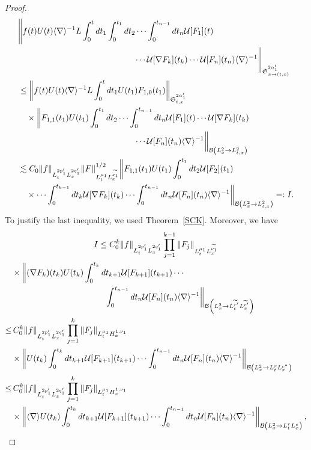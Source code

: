 \documentclass[10pt]{amsart}
\newcommand{\No}[1]{}
\theoremstyle{definition}
\numberwithin{equation}{section}
\newcommand{\CB}{\mathcal{B}}
\newcommand{\CU}{\mathcal{U}}
\newcommand{\FS}{\mathfrak{S}}
\newcommand{\al}{\alpha}
\newcommand{\wt}{\widetilde}
\renewcommand{\No}[1]{\left\| #1 \right\|}
\newcommand{\sd}{\langle \nabla \rangle}
\newcommand{\sdi}{\sd^{-1}}
\newcommand{\tx}{{t,x}}
\newcommand{\na}{\nabla}
\newcommand{\ls}{\lesssim}
\begin{document}
\begin{proof}
\begingroup
\allowdisplaybreaks
\begin{align}
&\Bigg\| f(t)U(t)\sdi L
\int_0^t dt_1
\int_0^{t_1} dt_2 \cdots \int_0^{t_{n-1}} dt_n
\CU[F_1](t) \\
&\mkern250mu\cdots \CU[\na F_k](t_k) \cdots \CU[F_n](t_n) \sdi\Bigg\|_{\FS^{2\al_1'}_{x \to (\tx)}} \nonumber\\
& \le \No{f(t)U(t)\sdi L \int_0^t dt_1 U(t_1)F_{1,0}(t_1)}_{\FS^{2\al_1'}_\tx} \nonumber\\
&\quad \times \bigg\| F_{1,1}(t_1)U(t_1)\int_0^{t_1} dt_2 \cdots \int_0^{t_{n-1}} dt_n
\CU[F_1](t) \cdots \CU[\na F_k](t_k)\nonumber\\
&\mkern250mu \cdots \CU[F_n](t_n) \sdi \bigg\|_{\CB\left(L^2_x \to L^2_\tx\right)} \nonumber\\
&\ls C_0
\|f\|_{L^{2p_1'}_t L^{2q_1'}_x}
\|F\|_{L^{\mu_1}_t L^{\wt{\nu_1}}_x}^{1/2} \bigg\| F_{1,1}(t_1)U(t_1)
\int_0^{t_1} dt_2 \CU[F_2](t_1)\nonumber\\
&\quad \times
\cdots
\int_0^{t_{k-1}} dt_k \CU[\na F_k](t_k)
\cdots
\int_0^{t_{n-1}} dt_n \CU[F_n](t_n) \sdi\bigg\|_{\CB\left(L^2_x \to L^2_\tx\right)} =: I.\nonumber
\end{align}
\endgroup
To justify the last inequality, we used Theorem~\ref{SCK}. Moreover, we have
\begin{multline}
I \le C_0^k
\|f\|_{L^{2p_1'}_t L^{2q_1'}_x}
\prod_{j=1}^{k-1}\|F_j\|_{L^{\mu_1}_t L^{\wt{\nu_1}}_x}\\
\begin{aligned}
&\times
\bigg\| (\na F_k)(t_k) U(t_k)
\int_0^{t_k}dt_{k+1} \CU[F_{k+1}](t_{k+1})
\cdots\\
&\mkern200mu\int_0^{t_{n-1}} dt_n \CU[F_n](t_n) \sdi \bigg\|_{\CB\left(L^2_x \to L^{\wt{r}'}_t L^{\wt{c}'}_x\right)} \\
\le&\, C_0^k \|f\|_{L^{2p_1'}_t L^{2q_1'}_x}
\prod_{j=1}^k \|F_j\|_{L^{\mu_1}_t H^{1,\nu_1}_x}\\
&\times
\No{ U(t_k)
\int_0^{t_k}dt_{k+1} \CU[F_{k+1}](t_{k+1})
\cdots
\int_0^{t_{n-1}} dt_n \CU[F_n](t_n) \sdi }_{\CB\left(L^2_x \to L^r_t L^{c^*}_x\right)} \\
\le&\, C_0^k \|f\|_{L^{2p_1'}_t L^{2q_1'}_x}
\prod_{j=1}^k \|F_j\|_{L^{\mu_1}_t H^{1,\nu_1}_x}\\
&\times
\No{
\sd U(t_k)
\int_0^{t_k}dt_{k+1} \CU[F_{k+1}](t_{k+1})
\cdots
\int_0^{t_{n-1}} dt_n \CU[F_n](t_n) \sdi }_{\CB\left(L^2_x \to L^r_t L^c_x\right)},
\end{aligned}

\end{multline}
\end{proof}
\end{document}
